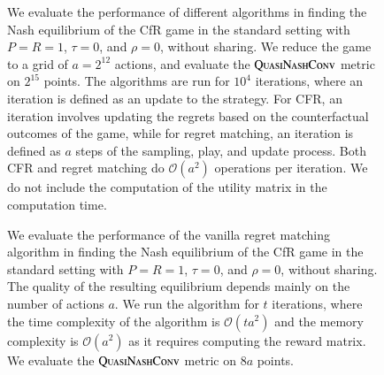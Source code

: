 \documentclass[preprint,12pt,authoryear]{elsarticle}
\theoremstyle{definition}
\begin{document}
\begin{figure}[htbp]
  \centering
  \begin{minipage}[t]{0.48\textwidth}
    \centering
    
  \end{minipage}
  \hfill
  \begin{minipage}[t]{0.48\textwidth}
    \centering
    
  \end{minipage}
  \caption{We evaluate the performance of different algorithms in finding the Nash equilibrium of the CfR game in the standard setting with $P=R=1$, $\tau=0$, and $\rho=0$, without sharing. We reduce the game to a grid of $a=2^{12}$ actions, and evaluate the $\textsc{QuasiNashConv}$ metric on $2^{15}$ points. The algorithms are run for $10^4$ iterations, where an iteration is defined as an update to the strategy. For CFR, an iteration involves updating the regrets based on the counterfactual outcomes of the game, while for regret matching, an iteration is defined as $a$ steps of the sampling, play, and update process. Both CFR and regret matching do $\mathcal{O}(a^2)$ operations per iteration. We do not include the computation of the utility matrix in the computation time.}
  \label{fig:rm-different}  
\end{figure}




\begin{figure}[htbp]
  \centering
  \begin{minipage}[t]{0.48\textwidth}
    \centering
    
  \end{minipage}
  \hfill
  \begin{minipage}[t]{0.48\textwidth}
    \centering
    
  \end{minipage}
  \caption{We evaluate the performance of the vanilla regret matching algorithm in finding the Nash equilibrium of the CfR game in the standard setting with $P=R=1$, $\tau=0$, and $\rho=0$, without sharing. The quality of the resulting equilibrium depends mainly on the number of actions $a$. We run the algorithm for $t$ iterations, where the time complexity of the algorithm is $\mathcal{O}(t a^2)$ and the memory complexity is $\mathcal{O}(a^2)$ as it requires computing the reward matrix. We evaluate the $\textsc{QuasiNashConv}$ metric on $8a$ points.}
  \label{fig:rm-size}  
\end{figure}
\end{document}
